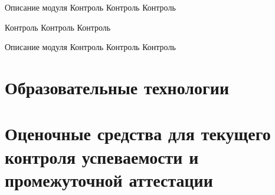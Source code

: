 



\myunit
	{Описание модуля}
	{Контроль Контроль Контроль}

\myunit
	{\lipsum[3-4]}
	{Контроль Контроль Контроль}

\myunit
	{Описание модуля}
	{Контроль Контроль Контроль}



\printhours





\section{Образовательные технологии}

\section{Оценочные средства для текущего контроля успеваемости и промежуточной аттестации}


